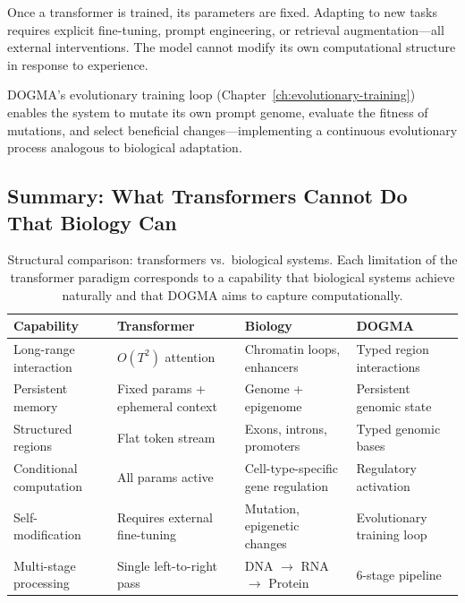 Once a transformer is trained, its parameters are fixed. Adapting to new tasks requires explicit fine-tuning, prompt engineering, or retrieval augmentation---all external interventions. The model cannot modify its own computational structure in response to experience.

DOGMA's evolutionary training loop (Chapter~\ref{ch:evolutionary-training}) enables the system to mutate its own prompt genome, evaluate the fitness of mutations, and select beneficial changes---implementing a continuous evolutionary process analogous to biological adaptation.

\subsection{Summary: What Transformers Cannot Do That Biology Can}

\begin{table}[ht]
\centering
\caption{Structural comparison: transformers vs.\ biological systems. Each limitation of the transformer paradigm corresponds to a capability that biological systems achieve naturally and that DOGMA aims to capture computationally.}
\label{tab:transformer-vs-biology}
\renewcommand{\arraystretch}{1.2}
\begin{tabularx}{\textwidth}{L{3.0cm} L{3.5cm} L{3.5cm} Y}
\toprule
\textbf{Capability} & \textbf{Transformer} & \textbf{Biology} & \textbf{DOGMA} \\
\midrule
Long-range interaction & $O(T^2)$ attention & Chromatin loops, enhancers & Typed region interactions \\
Persistent memory & Fixed params + ephemeral context & Genome + epigenome & Persistent genomic state \\
Structured regions & Flat token stream & Exons, introns, promoters & Typed genomic bases \\
Conditional computation & All params active & Cell-type-specific gene regulation & Regulatory activation \\
Self-modification & Requires external fine-tuning & Mutation, epigenetic changes & Evolutionary training loop \\
Multi-stage processing & Single left-to-right pass & DNA $\to$ RNA $\to$ Protein & 6-stage pipeline \\
\bottomrule
\end{tabularx}
\end{table}

